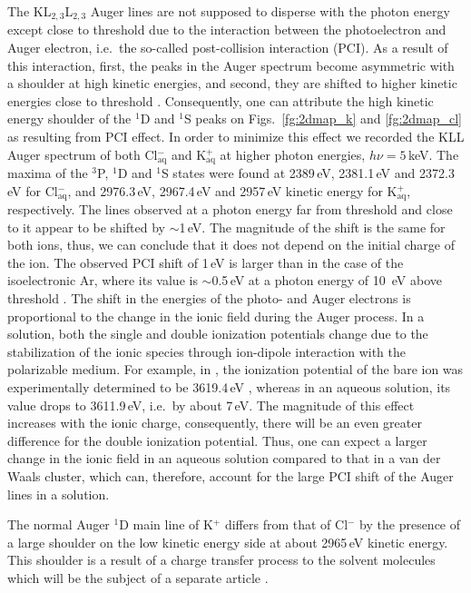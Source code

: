 The KL$_{2,3}$L$_{2,3}$ Auger lines are not supposed to disperse with the photon energy except close to threshold due to the interaction between the photoelectron and Auger electron, i.e.\ the so-called post-collision interaction (PCI). As a result of this interaction, first, the peaks in the Auger spectrum become asymmetric with a shoulder at high kinetic energies, and second, they are shifted to higher kinetic energies close to threshold \citep{russek86:911,guillemin15:012503}. Consequently, one can attribute the high kinetic energy shoulder of the $^1$D and $^1$S peaks on Figs.\ \ref{fg:2dmap_k} and \ref{fg:2dmap_cl} as resulting from PCI effect. In order to minimize this effect we recorded the KLL Auger spectrum of both Cl$^{-}_{\text{aq}}$ and K$^{+}_{\text{aq}}$ at higher photon energies, $h\nu = 5$\,keV. The maxima of the $^3$P, $^1$D and $^1$S states were found at 2389\,eV, 2381.1\,eV and 2372.3\,eV for Cl$^{-}_{\text{aq}}$, and 2976.3\,eV, 2967.4\,eV and 2957\,eV kinetic energy for K$^{+}_{\text{aq}}$, respectively. The lines observed at a photon energy far from threshold and close to it appear to be shifted by $\sim$1\,eV. The magnitude of the shift is the same for both ions, thus, we can conclude that it does not depend on the initial charge of the ion. The observed PCI shift of 1\,eV is larger than in the case of the isoelectronic Ar, where its value is $\sim$0.5\,eV at a photon energy of 10 \,eV above threshold \citep{guillemin15:012503}. The shift in the energies of the photo- and Auger electrons is proportional to the change in the ionic field during the Auger process. In a solution, both the single and double ionization potentials change due to the stabilization of the ionic species through ion-dipole interaction with the polarizable medium. For example, in \ki, the ionization potential of the bare ion was experimentally determined to be 3619.4\,eV \citep{hertlein06:062715}, whereas in an aqueous solution, its value drops to 3611.9\,eV, i.e.\ by about 7\,eV. The magnitude of this effect increases with the ionic charge, consequently, there will be an even greater difference for the double ionization potential. Thus, one can expect a larger change in the ionic field in an aqueous solution compared to that in a van der Waals cluster, which can, therefore, account for the large PCI shift of the Auger lines in a solution.


The normal Auger $^1$D main line of K$^{+}$ differs from that of Cl$^{-}$ by the presence of a large shoulder on the low kinetic energy side at about 2965\,eV kinetic energy. This shoulder is a result of a charge transfer process to the solvent molecules which will be the subject of a separate article \citep{ceolin17}.


